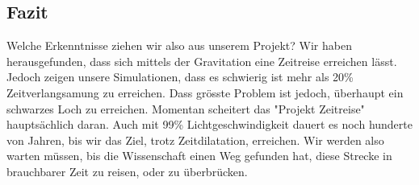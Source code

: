 \begin{refsection}
	
	\section{Fazit}
	
	Welche Erkenntnisse ziehen wir also aus unserem Projekt?
	Wir haben herausgefunden, dass sich mittels der Gravitation eine Zeitreise erreichen lässt. Jedoch zeigen unsere Simulationen, dass es schwierig ist mehr als 20\% Zeitverlangsamung zu erreichen. Dass grösste Problem ist jedoch, überhaupt ein schwarzes Loch zu erreichen. Momentan scheitert das "Projekt Zeitreise" hauptsächlich daran. Auch mit 99\% Lichtgeschwindigkeit dauert es noch hunderte von Jahren, bis wir das Ziel, trotz Zeitdilatation, erreichen. Wir werden also warten müssen, bis die Wissenschaft einen Weg gefunden hat, diese Strecke in brauchbarer Zeit zu reisen, oder zu überbrücken. %

	\printbibliography[heading=subbibliography]
	\end{refsection}


